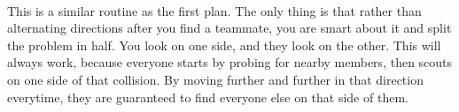 \documentclass[a4paper,12pt]{article}
\begin{document}
 \\
This is a similar routine as the first plan. The only thing is that rather than alternating directions
after you find a teammate, you are smart about it and split the problem in half. You look on one side, and 
they look on the other. This will always work, because everyone starts by probing for nearby members, then
scouts on one side of that collision. By moving further and further in that direction everytime, they are 
guaranteed to find everyone else on that side of them.
\end{document}
